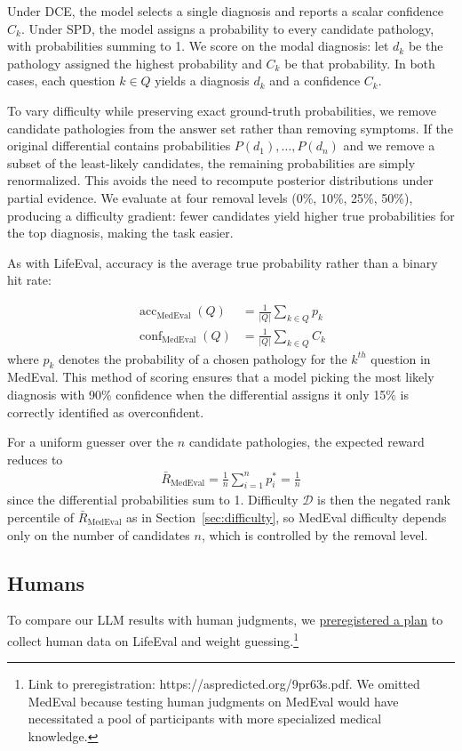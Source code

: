 \documentclass{article}
\begin{document}
Under DCE, the model selects a single diagnosis and reports a scalar confidence $C_k$. Under SPD, the model assigns a probability to every candidate pathology, with probabilities summing to 1. We score on the modal diagnosis: let $d_k$ be the pathology assigned the highest probability and $C_k$ be that probability. In both cases, each question $k \in Q$ yields a diagnosis $d_k$ and a confidence $C_k$.

To vary difficulty while preserving exact ground-truth probabilities, we remove candidate pathologies from the answer set rather than removing symptoms. If the original differential contains probabilities $P(d_1), \ldots, P(d_n)$ and we remove a subset of the least-likely candidates, the remaining probabilities are simply renormalized. This avoids the need to recompute posterior distributions under partial evidence. We evaluate at four removal levels (0\%, 10\%, 25\%, 50\%), producing a difficulty gradient: fewer candidates yield higher true probabilities for the top diagnosis, making the task easier.

As with LifeEval, accuracy is the average true probability rather than a binary hit rate:

\begin{align}
    \label{acc_conf}
    \operatorname{acc}_{\text{MedEval}}(Q) &= \frac{1}{|Q|}\sum_{k \in Q} p_k \\
    \operatorname{conf}_{\text{MedEval}}(Q) &= \frac{1}{|Q|}\sum_{k \in Q} C_k
\end{align}
where $p_k$ denotes the probability of a chosen pathology for the $k^{th}$ question in MedEval. This method of scoring ensures that a model picking the most likely diagnosis with 90\% confidence when the differential assigns it only 15\% is correctly identified as overconfident.

For a uniform guesser over the $n$ candidate pathologies, the expected reward reduces to
\begin{align}
    \bar{R}_{\text{MedEval}} = \frac{1}{n}\sum_{i=1}^{n} p^*_i = \frac{1}{n}
\end{align}
since the differential probabilities sum to 1. Difficulty $\mathcal{D}$ is then the negated rank percentile of $\bar{R}_{\text{MedEval}}$ as in Section~\ref{sec:difficulty}, so MedEval difficulty depends only on the number of candidates $n$, which is controlled by the removal level.


\subsection{Humans}
To compare our LLM results with human judgments, we \href{https://aspredicted.org/9pr63s.pdf}{preregistered a plan} to collect human data on LifeEval and weight guessing.\footnote{Link to preregistration: https://aspredicted.org/9pr63s.pdf. We omitted MedEval because testing human judgments on MedEval would have necessitated a pool of participants with more specialized medical knowledge.} 
\end{document}
